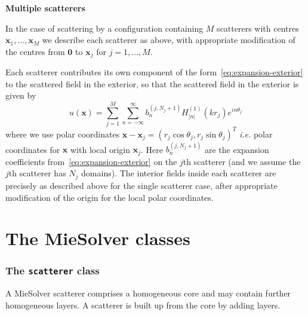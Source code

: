 \documentclass[11pt,letterpaper]{article}
\newcommand{\x}{\boldsymbol{x}}
\newcommand{\zero}{\boldsymbol{0}}
\newcommand{\ie}{{\em i.e.}}
\newcommand{\techheading}[1]{%
    \par\vspace{-0.3\parskip}\noindent\hspace{-1cm}\textbf{#1}%
    \par\vspace{-0.5\parskip}\noindent\nopagebreak\ignorespaces}
\begin{document}

\techheading{Multiple scatterers}
In the case of scattering by a configuration containing $M$ scatterers
with centres $\x_1,\dots,\x_M$
we describe
each scatterer as above, with appropriate modification of the
centres from $\zero$ to $\x_j$ for $j=1,\dots,M$.

Each scatterer contributes its own component of the
form~\eqref{eq:expansion-exterior} to the scattered field in the exterior,
so that the scattered field in the exterior
is given by
\begin{equation}
  \label{eq:expansion-multiple}
  u(\x) = \sum_{j=1}^M 
  \sum_{n=-\infty}^\infty b^{(j,N_j+1)}_n H^{(1)}_{|n|}(k r_j) e^{i n \theta_j}
\end{equation}
where we use polar coordinates
$\x-\x_j = (r_j \cos \theta_j,r_j \sin \theta_j)^T$
\ie{} polar coordinates for $\x$ with local origin $\x_j$.
Here $b^{(j,N_j+1)}_n$ are the expansion coefficients
from~\eqref{eq:expansion-exterior}
on the $j$th scatterer
(and we assume the $j$th scatterer has $N_j$ domains).
The interior fields inside each scatterer are precisely as described above
for the single scatterer case, after appropriate modification of the origin
for the local polar coordinates.

\part{The MieSolver classes}
\label{part:core}

\section{The \texttt{scatterer} class}
\label{sec:class-scatterer}

A MieSolver scatterer comprises a  homogeneous core
and may contain further homogeneous layers.
A scatterer is built up from the core by adding layers.
\end{document}

